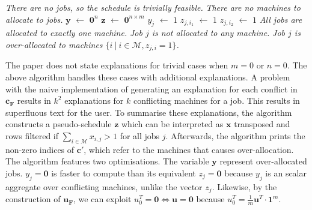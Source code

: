 \begin{algorithm}[H]
	\caption{}
	\begin{algorithmic}[1]
					\State \emph{There are no jobs, so the schedule is trivially feasible.}
				\Else
					\State \emph{There are no machines to allocate to jobs.}
				\EndIf
			\Else
				\State $\mathbf{y}$ $\gets$ $\mathbf{0}^n$
				\State $\mathbf{z}$ $\gets$ $\mathbf{0}^{n\times m}$
								\State $y_j$ $\gets$ $1$
								\State $z_{j,i_1}$ $\gets$ $1$
								\State $z_{j,i_2}$ $\gets$ $1$
							\EndIf
						\EndFor
					\EndFor					
				\EndFor
					\State \emph{All jobs are allocated to exactly one machine.}
				\Else
							\State \emph{Job $j$ is not allocated to any machine.}
						\EndIf
							\State \emph{Job $j$ is over-allocated to machines $\{i\ |\ i\in\mathcal{M}, z_{j,i}=1\}$.}
						\EndIf
					\EndFor
				\EndIf
			\EndIf
		\EndFunction
	\end{algorithmic}
\end{algorithm}

The paper \cite{aes} does not state explanations for trivial cases when $m=0$ or $n=0$. The above algorithm handles these cases with additional explanations. A problem with the naive implementation of generating an explanation for each conflict in $\mathbf{c_F}$ results in $k^2$ explanations for $k$ conflicting machines for a job. This results in superfluous text for the user. To summarise these explanations, the algorithm constructs a pseudo-schedule $\mathbf{z}$ which can be interpreted as $\mathbf{x}$ transposed and rows filtered if $\sum_{i\in\mathcal{M}}x_{i,j}>1$ for all jobs $j$. Afterwards, the algorithm prints the non-zero indices of $\mathbf{c}'$, which refer to the machines that causes over-allocation.
\linespace
The algorithm features two optimisations. The variable $\mathbf{y}$ represent over-allocated jobs. $y_j=\mathbf{0}$ is faster to compute than its equivalent $z_j=\mathbf{0}$ because $y_j$ is an scalar aggregate over conflicting machines, unlike the vector $z_j$. Likewise, by the construction of $\mathbf{u_F}$, we can exploit $u^T_0=\mathbf{0}\iff\mathbf{u}=\mathbf{0}$ because $u^T_0=\frac{1}{m}\mathbf{u}^T\cdot\mathbf{1}^m$.

